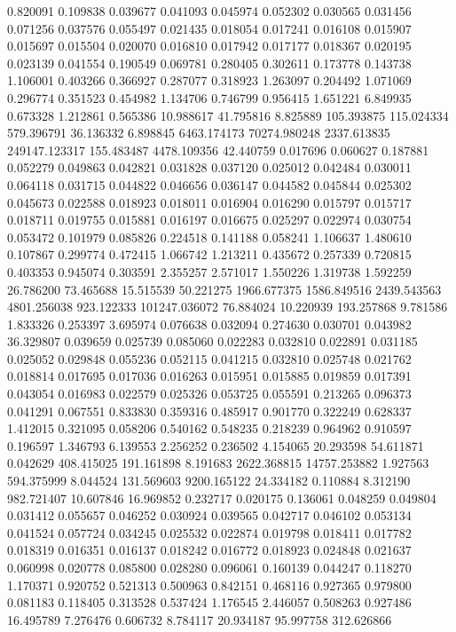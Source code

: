 0.820091
0.109838
0.039677
0.041093
0.045974
0.052302
0.030565
0.031456
0.071256
0.037576
0.055497
0.021435
0.018054
0.017241
0.016108
0.015907
0.015697
0.015504
0.020070
0.016810
0.017942
0.017177
0.018367
0.020195
0.023139
0.041554
0.190549
0.069781
0.280405
0.302611
0.173778
0.143738
1.106001
0.403266
0.366927
0.287077
0.318923
1.263097
0.204492
1.071069
0.296774
0.351523
0.454982
1.134706
0.746799
0.956415
1.651221
6.849935
0.673328
1.212861
0.565386
10.988617
41.795816
8.825889
105.393875
115.024334
579.396791
36.136332
6.898845
6463.174173
70274.980248
2337.613835
249147.123317
155.483487
4478.109356
42.440759
0.017696
0.060627
0.187881
0.052279
0.049863
0.042821
0.031828
0.037120
0.025012
0.042484
0.030011
0.064118
0.031715
0.044822
0.046656
0.036147
0.044582
0.045844
0.025302
0.045673
0.022588
0.018923
0.018011
0.016904
0.016290
0.015797
0.015717
0.018711
0.019755
0.015881
0.016197
0.016675
0.025297
0.022974
0.030754
0.053472
0.101979
0.085826
0.224518
0.141188
0.058241
1.106637
1.480610
0.107867
0.299774
0.472415
1.066742
1.213211
0.435672
0.257339
0.720815
0.403353
0.945074
0.303591
2.355257
2.571017
1.550226
1.319738
1.592259
26.786200
73.465688
15.515539
50.221275
1966.677375
1586.849516
2439.543563
4801.256038
923.122333
101247.036072
76.884024
10.220939
193.257868
9.781586
1.833326
0.253397
3.695974
0.076638
0.032094
0.274630
0.030701
0.043982
36.329807
0.039659
0.025739
0.085060
0.022283
0.032810
0.022891
0.031185
0.025052
0.029848
0.055236
0.052115
0.041215
0.032810
0.025748
0.021762
0.018814
0.017695
0.017036
0.016263
0.015951
0.015885
0.019859
0.017391
0.043054
0.016983
0.022579
0.025326
0.053725
0.055591
0.213265
0.096373
0.041291
0.067551
0.833830
0.359316
0.485917
0.901770
0.322249
0.628337
1.412015
0.321095
0.058206
0.540162
0.548235
0.218239
0.964962
0.910597
0.196597
1.346793
6.139553
2.256252
0.236502
4.154065
20.293598
54.611871
0.042629
408.415025
191.161898
8.191683
2622.368815
14757.253882
1.927563
594.375999
8.044524
131.569603
9200.165122
24.334182
0.110884
8.312190
982.721407
10.607846
16.969852
0.232717
0.020175
0.136061
0.048259
0.049804
0.031412
0.055657
0.046252
0.030924
0.039565
0.042717
0.046102
0.053134
0.041524
0.057724
0.034245
0.025532
0.022874
0.019798
0.018411
0.017782
0.018319
0.016351
0.016137
0.018242
0.016772
0.018923
0.024848
0.021637
0.060998
0.020778
0.085800
0.028280
0.096061
0.160139
0.044247
0.118270
1.170371
0.920752
0.521313
0.500963
0.842151
0.468116
0.927365
0.979800
0.081183
0.118405
0.313528
0.537424
1.176545
2.446057
0.508263
0.927486
16.495789
7.276476
0.606732
8.784117
20.934187
95.997758
312.626866
